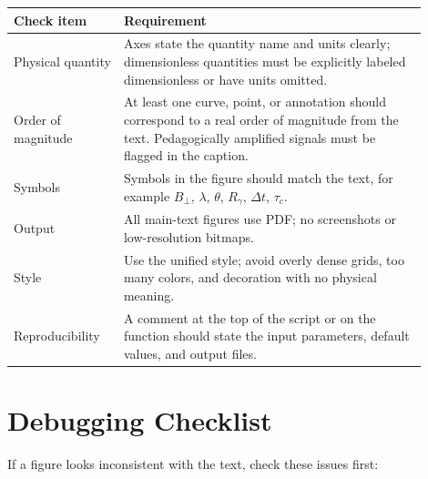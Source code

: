 \begin{longtable}{p{0.24\linewidth}p{0.66\linewidth}}
\toprule
Check item & Requirement \\
\midrule
Physical quantity & Axes state the quantity name and units clearly; dimensionless quantities must be explicitly labeled dimensionless or have units omitted. \\
Order of magnitude & At least one curve, point, or annotation should correspond to a real order of magnitude from the text. Pedagogically amplified signals must be flagged in the caption. \\
Symbols & Symbols in the figure should match the text, for example \(B_\perp\), \(\lambda\), \(\theta\), \(R_\gamma\), \(\Delta t\), \(\tau_c\). \\
Output & All main-text figures use PDF; no screenshots or low-resolution bitmaps. \\
Style & Use the unified style; avoid overly dense grids, too many colors, and decoration with no physical meaning. \\
Reproducibility & A comment at the top of the script or on the function should state the input parameters, default values, and output files. \\
\bottomrule
\end{longtable}

\section{Debugging Checklist}
\label{appsec:e-debug}

If a figure looks inconsistent with the text, check these issues first:


